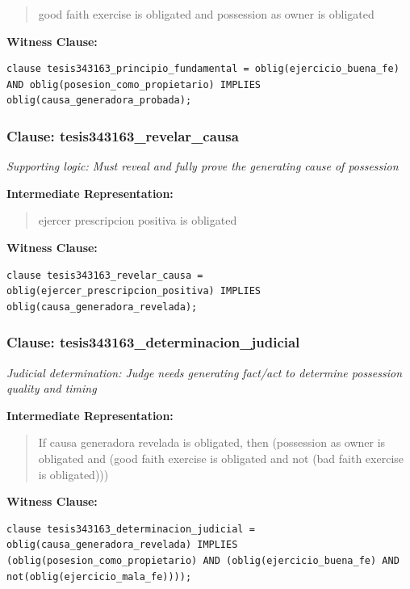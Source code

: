 \documentclass[11pt,a4paper]{article}
\begin{document}
\begin{quote}
good faith exercise is obligated and possession as owner is obligated
\end{quote}

\textbf{Witness Clause:}

\begin{lstlisting}[style=witnessstyle, language=Witness]
clause tesis343163_principio_fundamental = oblig(ejercicio_buena_fe) AND oblig(posesion_como_propietario) IMPLIES oblig(causa_generadora_probada);
\end{lstlisting}

\subsubsection{Clause: tesis343163\_revelar\_causa}

\textit{Supporting logic: Must reveal and fully prove the generating cause of possession}

\textbf{Intermediate Representation:}

\begin{quote}
ejercer prescripcion positiva is obligated
\end{quote}

\textbf{Witness Clause:}

\begin{lstlisting}[style=witnessstyle, language=Witness]
clause tesis343163_revelar_causa = oblig(ejercer_prescripcion_positiva) IMPLIES oblig(causa_generadora_revelada);
\end{lstlisting}

\subsubsection{Clause: tesis343163\_determinacion\_judicial}

\textit{Judicial determination: Judge needs generating fact/act to determine possession quality and timing}

\textbf{Intermediate Representation:}

\begin{quote}
If causa generadora revelada is obligated, then (possession as owner is obligated and (good faith exercise is obligated and not (bad faith exercise is obligated)))
\end{quote}

\textbf{Witness Clause:}

\begin{lstlisting}[style=witnessstyle, language=Witness]
clause tesis343163_determinacion_judicial = oblig(causa_generadora_revelada) IMPLIES (oblig(posesion_como_propietario) AND (oblig(ejercicio_buena_fe) AND not(oblig(ejercicio_mala_fe))));
\end{lstlisting}
\end{document}
